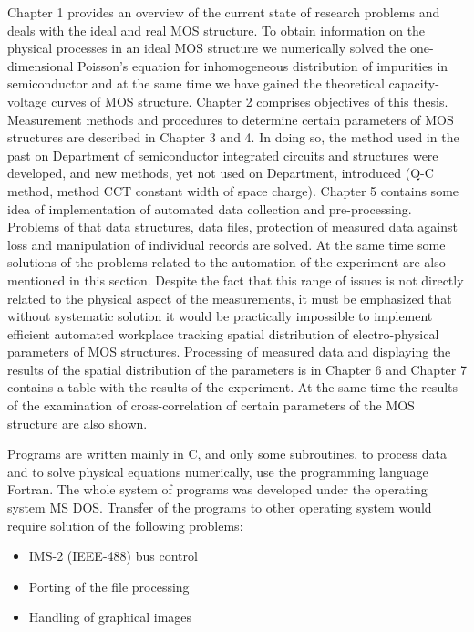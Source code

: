\par Chapter 1 provides an overview of the current state of research
problems and deals with the ideal and real MOS structure. To obtain
information on the physical processes in an ideal MOS structure we
numerically solved the one-dimensional Poisson's equation for
inhomogeneous distribution of impurities in semiconductor and at the
same time we have gained the theoretical capacity-voltage curves of
MOS structure. Chapter 2 comprises objectives of this
thesis. Measurement methods and procedures to determine certain
parameters of MOS structures are described in Chapter 3 and 4. In
doing so, the method used in the past on Department of semiconductor
integrated circuits and structures were developed, and new methods,
yet not used on Department, introduced (Q-C method, method CCT
constant width of space charge). Chapter 5 contains some idea of
implementation of automated data collection and
pre-processing. Problems of that data structures, data files,
protection of measured data against loss and manipulation of
individual records are solved.  At the same time some solutions of the
problems related to the automation of the experiment are also
mentioned in this section. Despite the fact that this range of issues
is not directly related to the physical aspect of the measurements, it
must be emphasized that without systematic solution it would be
practically impossible to implement efficient automated workplace
tracking spatial distribution of electro-physical parameters of MOS
structures. Processing of measured data and displaying the results of
the spatial distribution of the parameters is in Chapter 6 and Chapter
7 contains a table with the results of the experiment. At the same
time the results of the examination of cross-correlation of certain
parameters of the MOS structure are also shown.

\par Programs are written mainly in C, and only some subroutines, to
process data and to solve physical equations numerically, use the
programming language Fortran. The whole system of programs was
developed under the operating system MS DOS\@. Transfer of the programs
to other operating system would require solution of the following
problems:
\begin{itemize}
\item IMS-2 (IEEE-488) bus control
\item Porting of the file processing
\item Handling of graphical images
\end{itemize}

